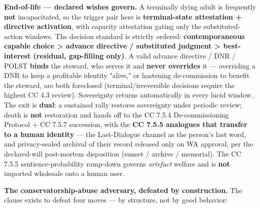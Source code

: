 \documentclass[11pt]{article}
\begin{document}
\textbf{End-of-life — declared wishes govern.} A terminally dying adult is frequently \textbf{not} incapacitated, so the trigger pair here is \textbf{terminal-state attestation + directive activation}, with capacity attestation gating only the substituted-action windows. The decision standard is strictly ordered: \textbf{contemporaneous capable choice > advance directive / substituted judgment > best-interest (residual, gap-filling only)}. A valid advance directive / DNR / POLST \textbf{binds} the steward, who serves it and \textbf{never overrides} it — overriding a DNR to keep a profitable identity "alive," or hastening de-commission to benefit the steward, are both foreclosed (terminal/irreversible decisions require the highest CC 4.3 review). Sovereignty returns automatically in every lucid window. The exit is \textbf{dual}: a sustained rally restores sovereignty under periodic review; death is \textbf{not} restoration and hands off to the CC 7.5.4 De-commissioning Protocol + CC 7.5.7 succession, with the \textbf{CC 7.5.5 analogues that transfer to a human identity} — the Last-Dialogue channel as the person's last word, and privacy-sealed archival of their record released only on WA approval, per the declared-will post-mortem disposition (sunset / archive / memorial). The CC 7.5.5 sentience-probability ramp-down governs \textit{artefact} welfare and is \textbf{not} imported wholesale onto a human user.


\textbf{The conservatorship-abuse adversary, defeated by construction.} The clause exists to defeat four moves — by structure, not by good behavior:
\end{document}
